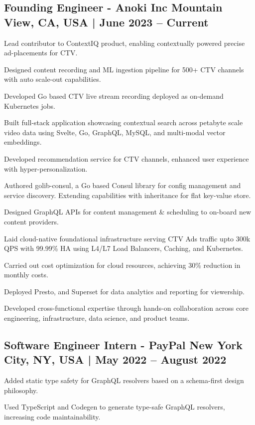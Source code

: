 \subsection{{Founding Engineer - Anoki Inc \hfill  Mountain View, CA, USA  | June 2023 -- Current}}
\begin{zitemize}
\item Lead contributor to ContextIQ product, enabling contextually powered precise ad-placements for CTV.
\item Designed content recording and ML ingestion pipeline for 500+ CTV channels with auto scale-out capabilities.
\item Developed Go based CTV live stream recording deployed as on-demand Kubernetes jobs.
\item Built full-stack application showcasing contextual search across petabyte scale video data using Svelte, Go, GraphQL, MySQL, and multi-modal vector embeddings.
\item Developed recommendation service for CTV channels, enhanced user experience with hyper-personalization.
\item Authored golib-consul, a Go based Consul library for config management and service discovery. Extending capabilities with inheritance for flat key-value store.
\item Designed GraphQL APIs for content management \& scheduling to on-board new content providers.
\item Laid cloud-native foundational infrastructure serving CTV Ads traffic upto 300k QPS with 99.99\% HA using L4/L7 Load Balancers, Caching, and Kubernetes.
\item Carried out cost optimization for cloud resources, achieving 30\% reduction in monthly costs.
\item Deployed Presto, and Superset for data analytics and reporting for viewership.
\item Developed cross-functional expertise through hands-on collaboration across core engineering, infrastructure, data science, and product teams.
\end{zitemize}

\subsection{{Software Engineer Intern - PayPal \hfill New York City, NY, USA | May 2022 -- August 2022}}
\begin{zitemize}
\item Added static type safety for GraphQL resolvers based on a schema-first design philosophy.
\item Used TypeScript and Codegen to generate type-safe GraphQL resolvers, increasing code maintainability.
\end{zitemize}


